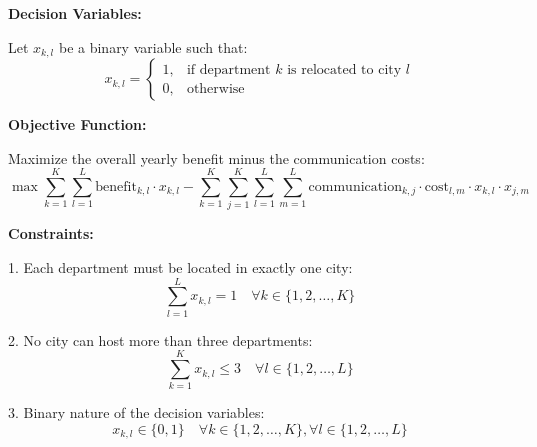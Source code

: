 \documentclass{article}
\begin{document}
\textbf{Decision Variables:}

Let \( x_{k, l} \) be a binary variable such that:
\[
x_{k, l} =
\begin{cases} 
1, & \text{if department } k \text{ is relocated to city } l \\ 
0, & \text{otherwise} 
\end{cases}
\]

\textbf{Objective Function:}

Maximize the overall yearly benefit minus the communication costs:
\[
\max \sum_{k=1}^{K} \sum_{l=1}^{L} \text{benefit}_{k, l} \cdot x_{k, l} - \sum_{k=1}^{K} \sum_{j=1}^{K} \sum_{l=1}^{L} \sum_{m=1}^{L} \text{communication}_{k, j} \cdot \text{cost}_{l, m} \cdot x_{k, l} \cdot x_{j, m}
\]

\textbf{Constraints:}

1. Each department must be located in exactly one city:
   \[
   \sum_{l=1}^{L} x_{k, l} = 1 \quad \forall k \in \{1, 2, \ldots, K\}
   \]

2. No city can host more than three departments:
   \[
   \sum_{k=1}^{K} x_{k, l} \leq 3 \quad \forall l \in \{1, 2, \ldots, L\}
   \]

3. Binary nature of the decision variables:
   \[
   x_{k, l} \in \{0, 1\} \quad \forall k \in \{1, 2, \ldots, K\}, \forall l \in \{1, 2, \ldots, L\}
   \]
\end{document}
